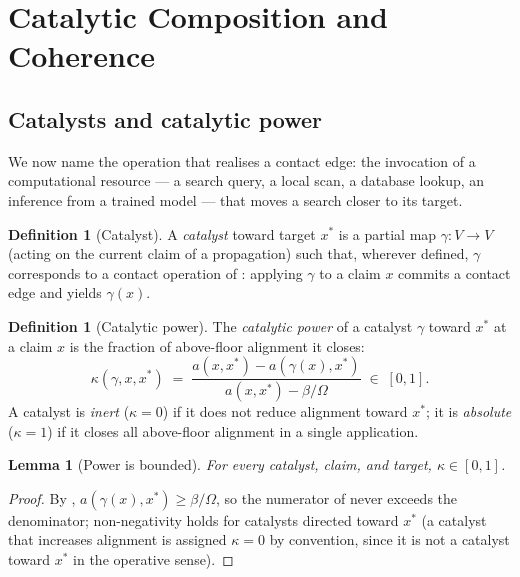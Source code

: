 \documentclass[11pt,twocolumn,a4paper]{article}
\theoremstyle{thmstyle}
\newtheorem{lemma}[theorem]{Lemma}
\theoremstyle{definition}
\newtheorem{definition}[theorem]{Definition}
\theoremstyle{remark}
\newcommand{\V}{V}
\newcommand{\flo}{\beta}
\newcommand{\pot}{\kappa}
\begin{document}
\section{Catalytic Composition and Coherence}
\label{sec:catalysis}

\subsection{Catalysts and catalytic power}

We now name the operation that realises a contact edge: the invocation of
a computational resource --- a search query, a local scan, a database
lookup, an inference from a trained model --- that moves a search closer to
its target.

\begin{definition}[Catalyst]
\label{def:catalyst}
A \emph{catalyst} toward target $x^{\ast}$ is a partial map
$\gamma\colon\V\to\V$ (acting on the current claim of a propagation) such
that, wherever defined, $\gamma$ corresponds to a contact operation of
: applying $\gamma$ to a claim $x$ commits a contact
edge and yields $\gamma(x)$.
\end{definition}

\begin{definition}[Catalytic power]
\label{def:power}
The \emph{catalytic power} of a catalyst $\gamma$ toward $x^{\ast}$ at a
claim $x$ is the fraction of above-floor alignment it closes:
\[
\pot(\gamma,x,x^{\ast})\;=\;
\frac{a(x,x^{\ast})-a(\gamma(x),x^{\ast})}{a(x,x^{\ast})-\flo/\Omega}
\;\in\;[0,1].
\]
A catalyst is \emph{inert} ($\pot=0$) if it does not reduce alignment
toward $x^{\ast}$; it is \emph{absolute} ($\pot=1$) if it closes all
above-floor alignment in a single application.
\end{definition}

\begin{lemma}[Power is bounded]
\label{lem:powerbound}
For every catalyst, claim, and target, $\pot\in[0,1]$.
\end{lemma}

\begin{proof}
By , $a(\gamma(x),x^{\ast})\ge\flo/\Omega$, so the
numerator of  never exceeds the denominator; non-negativity
holds for catalysts directed toward $x^{\ast}$ (a catalyst that increases
alignment is assigned $\pot=0$ by convention, since it is not a catalyst
toward $x^{\ast}$ in the operative sense).
\end{proof}
\end{document}
